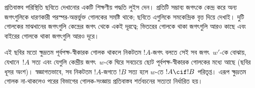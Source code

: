 \documentclass[../../../include/open-logic-section]{subfiles}
\begin{document}
প্রতিবাস্তব পরিস্থিতি ছবিতে দেখানোর একটি শিক্ষণীয়
পদ্ধতি লুইস দেন। প্রতিটি সম্ভাব্য জগৎকে কেন্দ্র করে
অন্য জগৎগুলিকে ধারণকারী পরস্পর-অন্তর্ভুক্ত গোলকের
সমষ্টি থাকে; ছবিতে এগুলিকে সমকেন্দ্রিক বৃত্ত দিয়ে
দেখাই। দুটি গোলকের মাঝখানের জগৎগুলি কেন্দ্রের জগৎ
থেকে একই দূরত্বে; ভিতরের গোলকে থাকা জগৎগুলি আরও
কাছে এবং বাইরের গোলকে থাকা জগৎগুলি আরও দূরে।
\begin{center}
\end{center}
এই ছবির মতো ক্ষুদ্রতম পূর্বপক্ষ-স্বীকারক গোলক থাকলে
নিকটতম $!A$-জগৎ বলতে সেই সব জগৎ~$w'$-কে বোঝায়, যেখানে~$!A$ সত্য
এবং যেগুলি কেন্দ্রীয় জগৎ~$w$-কে ঘিরে সবচেয়ে ছোট পূর্বপক্ষ-স্বীকারক গোলকের মধ্যে আছে
(ছবির ধূসর অংশ)। স্বজ্ঞাগতভাবে, সব নিকটতম
$!A$-জগতে $!B$ সত্য হলে $w$-তে $!A \cif !B$
পরিতৃপ্ত। এরূপ ক্ষুদ্রতম গোলক না-থাকলেও পরের বিভাগের
গোলক-সংজ্ঞায় প্রতিবাস্তব শর্তবচনের সত্যতা নির্ধারিত হয়।
\end{document}
